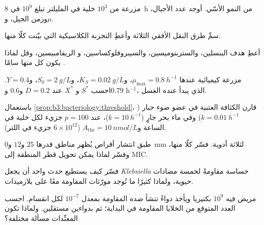 \begin{exercise}[$\star$]\label{exo:b3:bacteriology:2}
مزرعة من $10^{3}$ خلية في المليلتر تبلغ $10^{9}$ في
\qty{8}{h} من النمو الأسّي. أوجد عدد الأجيال، وزمن
الجيل، و$\mu$.
\end{exercise}

\begin{exercise}[$\star$]\label{exo:b3:bacteriology:3}
سمِّ طرق النقل الأفقي الثلاثة وأعطِ التجربة الكلاسيكية
التي بيّنت كلًا منها.
\end{exercise}

\begin{exercise}[$\star$]\label{exo:b3:bacteriology:4}
أعطِ هدف البنسلين، والستربتوميسين، والسيبروفلوكساسين، و
الريفامبيسين، وقل لماذا يكون كل منها سامًا .
\end{exercise}

\begin{exercise}[$\star\star$]\label{exo:b3:bacteriology:5}
مزرعة كيميائية عندها $\mu_{\max} = \qty{0.8}{h^{-1}}$، و$K_{S} =
\qty{0.02}{g/L}$، و$S_{0} = \qty{2}{g/L}$، و$Y = 0.4$. احسب $S^{*}$ و
$X^{*}$ عند $D = 0.2$ و$0.6$ و$0.79$ h$^{-1}$، 
الذي يبدأ عنده الغسل.
\end{exercise}

\begin{exercise}[$\star\star$]\label{exo:b3:bacteriology:6}
باستعمال \cref{prop:b3:bacteriology:threshold}، قارن الكثافة
العتبية  في عضو ضوء حبار ($k =
\qty{0.01}{h^{-1}}$) وفي ماء بحر جارٍ ($k = \qty{10}{h^{-1}}$)،
عند $p = 100$ جزيء لكل خلية في الساعة و$A_{\text{thr}} =
\qty{10}{nmol/L}$ ($6\times 10^{12}$ جزيء في اللتر).
\end{exercise}

\begin{exercise}[$\star\star$]\label{exo:b3:bacteriology:7}
طبق انتشار أقراص يُظهر مناطق قدرها $25$ و$12$ و\qty{0}{mm} لثلاثة
أدوية. فسّر كلًا منها، وفسّر لماذا يمكن تحويل قطر المنطقة
إلى MIC.
\end{exercise}

\begin{exercise}[$\star\star$]\label{exo:b3:bacteriology:8}
فسّر كيف يستطيع حدث  واحد أن يجعل \emph{Klebsiella}
حساسة مقاومةً لخمسة مضادات حيوية، ولماذا كثيرًا ما تُوجد مورّثات
المقاومة معًا على بلازميدات.
\end{exercise}

\begin{exercise}[$\star\star$]\label{exo:b3:bacteriology:9}
مريض فيه $10^{9}$ بكتيريا ويأخذ دواءً تنشأ ضده
المقاومة بمعدل $10^{-7}$ لكل انقسام. احسب العدد المتوقع
من الخلايا المقاومة في البداية؛ ثم بدواءين مستقلين. ولماذا تكون
المعنِّدات مسألة مختلفة؟
\end{exercise}

